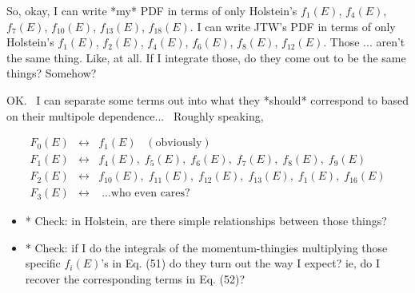 So, okay, I can write *my* PDF in terms of only Holstein's $ f_1(E)$,  $f_4(E)$,  $f_7(E)$,  $f_{10}(E)$,  $f_{13}(E)$,  $f_{18}(E)$.  I can write JTW's PDF in terms of only Holstein's $f_1(E)$,  $f_2(E)$,  $f_4(E)$,  $f_6(E)$,  $f_8(E)$,  $f_{12}(E)$.  Those ... aren't the same thing.  Like, at all.  If I integrate those, do they come out to be the same things?  Somehow?  

OK.  I can separate some terms out into what they *should* correspond to based on their multipole dependence...  Roughly speaking, 

\begin{eqnarray}
F_0(E) &\leftrightarrow& f_1(E) \;\;\; \mathrm{    (obviously)} \\
F_1(E) &\leftrightarrow& f_4(E), \; f_5(E), \; f_6(E), \; f_7(E), \; f_8(E), \; f_9(E) \\
F_2(E) &\leftrightarrow& f_{10}(E), \; f_{11}(E), \; f_{12}(E), \; f_{13}(E), \; f_1(E), \; f_{16}(E) \\ 
F_3(E) &\leftrightarrow& \; \textrm{...who even cares?}
\end{eqnarray}


\begin{itemize}
	\item * Check: in Holstein, are there simple relationships between those things?  
	\item * Check: if I do the integrals of the momentum-thingies multiplying those specific $f_i(E)$'s in Eq. (51) do they turn out the way I expect?  ie, do I recover the corresponding terms in Eq. (52)? 
\end{itemize}

